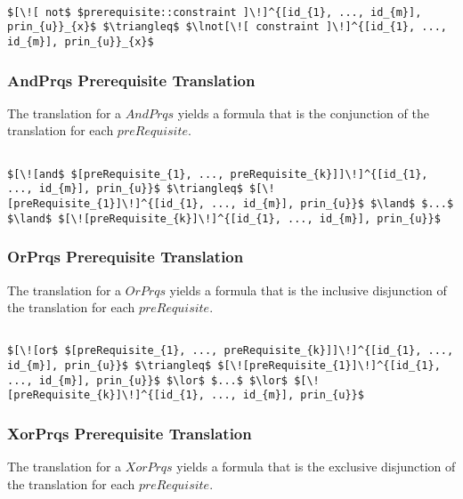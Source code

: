 \lstset{mathescape, language=AST}  
\begin{lstlisting}[frame=single, caption={Prerequisite Translation {$\colon$} Not Constraint},label={lst:transpreRequisiteNotConstraint}]

$[\![ not$ $prerequisite::constraint ]\!]^{[id_{1}, ..., id_{m}], prin_{u}}_{x}$ $\triangleq$ $\lnot[\![ constraint ]\!]^{[id_{1}, ..., id_{m}], prin_{u}}_{x}$ 
\end{lstlisting}

\subsubsection{AndPrqs Prerequisite Translation}
The translation for a $AndPrqs$ yields a formula that is the conjunction of the translation for each $preRequisite$.

\lstset{mathescape, language=AST}  
\begin{lstlisting}[frame=single, caption={Prerequisite Translation {$\colon$} Conjunction },label={lst:transpreRequisiteAndPrqs}]

$[\![and$ $[preRequisite_{1}, ..., preRequisite_{k}]]\!]^{[id_{1}, ..., id_{m}], prin_{u}}$ $\triangleq$ $[\![preRequisite_{1}]\!]^{[id_{1}, ..., id_{m}], prin_{u}}$ $\land$ $...$ $\land$ $[\![preRequisite_{k}]\!]^{[id_{1}, ..., id_{m}], prin_{u}}$

\end{lstlisting}

\subsubsection{OrPrqs Prerequisite Translation}
The translation for a $OrPrqs$ yields a formula that is the inclusive disjunction of the translation for each $preRequisite$.

\lstset{mathescape, language=AST}  
\begin{lstlisting}[frame=single, caption={Prerequisite Translation {$\colon$} Inclusive Disjunction},label={lst:transpreRequisiteOrPrqs}]

$[\![or$ $[preRequisite_{1}, ..., preRequisite_{k}]]\!]^{[id_{1}, ..., id_{m}], prin_{u}}$ $\triangleq$ $[\![preRequisite_{1}]\!]^{[id_{1}, ..., id_{m}], prin_{u}}$ $\lor$ $...$ $\lor$ $[\![preRequisite_{k}]\!]^{[id_{1}, ..., id_{m}], prin_{u}}$

\end{lstlisting}

\subsubsection{XorPrqs Prerequisite Translation}
The translation for a $XorPrqs$ yields a formula that is the exclusive disjunction of the translation for each $preRequisite$.


